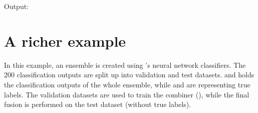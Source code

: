 \documentclass[letterpaper,10pt,english]{sphinxmanual}
\begin{document}
\sphinxAtStartPar
Output:

\begin{sphinxVerbatim}[commandchars=\\\{\}]
\PYG{o}{[}\PYG{o}{[}  \PYG{o}{]}
 \PYG{o}{[}  \PYG{o}{]}
 \PYG{o}{[}  \PYG{o}{]}\PYG{o}{]}
\end{sphinxVerbatim}


\section{A richer example}
\label{\detokenize{usage_and_examples:a-richer-example}}
\sphinxAtStartPar
In this example, an ensemble is created using ’s neural network classifiers.
The 200 classification outputs are split up into validation and test datasets.
 and  holds the classification outputs of the whole ensemble, while
 and  are representing true labels.
The validation datasets are used to train the  combiner ({\hyperref[\detokenize{pusion.core.dempster_shafer_combiner:ds-cref}]{}}), while the
final fusion is performed on the test dataset (without true labels).
\end{document}

